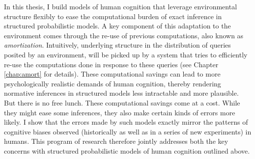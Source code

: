In this thesis, I build models of human cognition that leverage environmental structure flexibly to ease the computational burden of exact inference in structured probabilistic models. A key component of this adaptation to the environment comes through the re-use of previous computations, also known as \textit{amortization}. Intuitively, underlying structure in the distribution of queries posited by an environment, will be picked up by a system that tries to efficiently re-use the computations done in response to these queries (see Chapter \ref{chap:amort} for details). These computational savings can lead to more psychologically realistic demands of human cognition, thereby rendering normative inferences in structured models less intractable and more plausible. But there is no free lunch. These computational savings come at a cost. While they might ease some inferences, they also make certain kinds of errors more likely. I show that the errors made by such models exactly mirror the patterns of cognitive biases observed (historically as well as in a series of new experiments) in humans. This program of research therefore jointly addresses both the key concerns with structured probabilistic models of human cognition outlined above.


